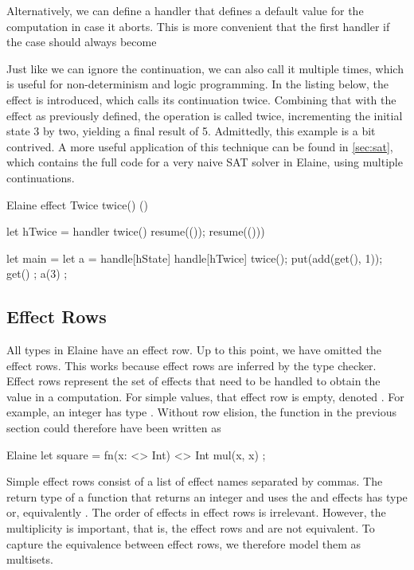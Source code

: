 
Alternatively, we can define a handler that defines a default value for the computation in case it aborts. This is more convenient that the first handler if the  case should always become


Just like we can ignore the continuation, we can also call it multiple times, which is useful for non-determinism and logic programming. In the listing below, the  effect is introduced, which calls its continuation twice. Combining that with the  effect as previously defined, the  operation is called twice, incrementing the initial state 3 by two, yielding a final result of 5. Admittedly, this example is a bit contrived. A more useful application of this technique can be found in \cref{sec:sat}, which contains the full code for a very naive SAT solver in Elaine, using multiple continuations.

\begin{lst}{Elaine}
effect Twice {
    twice() ()
}

let hTwice = handler {
    twice() {
        resume(());
        resume(()))
    }
}

let main = {
    let a = handle[hState] handle[hTwice] {
        twice();
        put(add(get(), 1));
        get()
    };
    a(3)
};
\end{lst}

\subsection{Effect Rows}

All types in Elaine have an effect row. Up to this point, we have omitted the effect rows. This works because effect rows are inferred by the type checker. Effect rows represent the set of effects that need to be handled to obtain the value in a computation. For simple values, that effect row is empty, denoted \el{<>}. For example, an integer has type . Without row elision, the  function in the previous section could therefore have been written as

\begin{lst}{Elaine}
let square = fn(x: <> Int) <> Int {
    mul(x, x)
};
\end{lst}

Simple effect rows consist of a list of effect names separated by commas. The return type of a function that returns an integer and uses the  and  effects has type  or, equivalently . The order of effects in effect rows is irrelevant. However, the multiplicity is important, that is, the effect rows  and  are not equivalent. To capture the equivalence between effect rows, we therefore model them as multisets.

